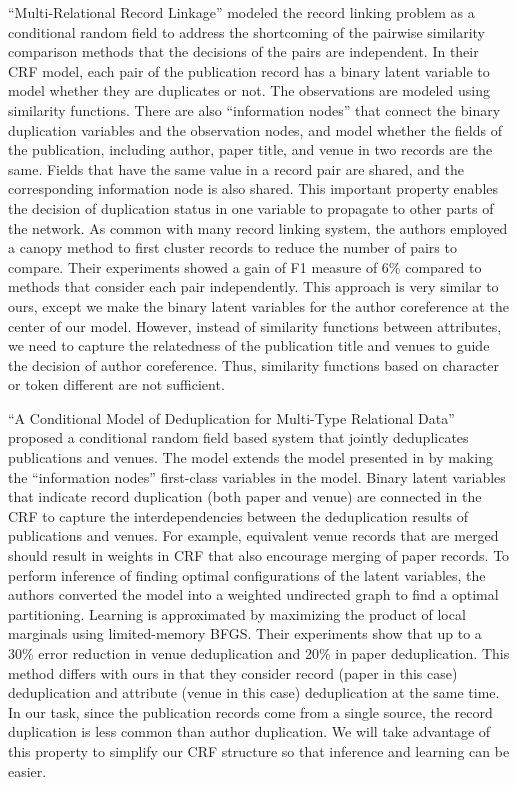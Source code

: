 \documentclass[]{article}
\begin{document}
``Multi-Relational Record Linkage'' \cite{Domingos04multi} modeled the record linking problem as a conditional random field to address the shortcoming of the pairwise similarity comparison methods that the decisions of the pairs are independent.  In their CRF model, each pair of the publication record has a binary latent variable to model whether they are duplicates or not.  The observations are modeled using similarity functions.  There are also ``information nodes'' that connect the binary duplication variables and the observation nodes, and model whether the fields of the publication, including author, paper title, and venue in two records are the same.  Fields that have the same value in a record pair are shared, and the corresponding information node is also shared.  This important property enables the decision of duplication status in one variable to propagate to other parts of the network.  As common with many record linking system, the authors employed a canopy method to first cluster records to reduce the number of pairs to compare.  Their experiments showed a gain of F1 measure of 6\% compared to methods that consider each pair independently.  This approach is very similar to ours, except we make the binary latent variables for the author coreference at the center of our model.  However, instead of similarity functions between attributes, we need to capture the relatedness of the publication title and venues to guide the decision of author coreference.  Thus, similarity functions based on character or token different are not sufficient.

``A Conditional Model of Deduplication for Multi-Type Relational Data'' \cite{Culotta05aconditional} proposed a conditional random field based system that jointly deduplicates publications and venues.  The model extends the model presented in \cite{Domingos04multi} by making the ``information nodes'' first-class variables in the model.  Binary latent variables that indicate record duplication (both paper and venue) are connected in the CRF to capture the interdependencies between the deduplication results of publications and venues.  For example, equivalent venue records that are merged should result in weights in CRF that also encourage merging of paper records.  To perform inference of finding optimal configurations of the latent variables, the authors converted the model into a weighted undirected graph to find a optimal partitioning.  Learning is approximated by maximizing the product of local marginals using limited-memory BFGS.  Their experiments show that up to a 30\% error reduction in venue deduplication and 20\% in paper deduplication.  This method differs with ours in that they consider record (paper in this case) deduplication and attribute (venue in this case) deduplication at the same time.  In our task, since the publication records come from a single source, the record duplication is less common than author duplication.  We will take advantage of this property to simplify our CRF structure so that inference and learning can be easier.
\end{document}
